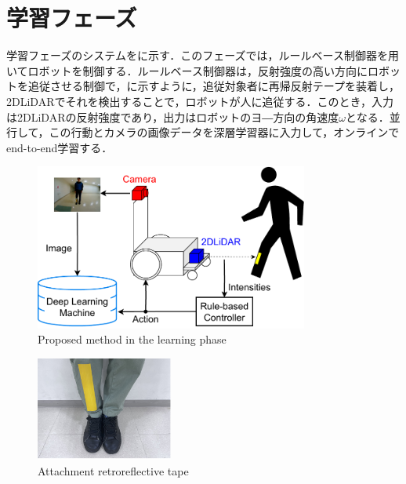 
\section{学習フェーズ}

  学習フェーズのシステムをに示す．このフェーズでは，ルールベース制御器を用いてロボットを制御する．ルールベース制御器は，反射強度の高い方向にロボットを追従させる制御で，に示すように，追従対象者に再帰反射テープを装着し，2DLiDARでそれを検出することで，ロボットが人に追従する．このとき，入力は2DLiDARの反射強度であり，出力はロボットのヨ―方向の角速度$\omega$となる．並行して，この行動とカメラの画像データを深層学習器に入力して，オンラインでend-to-end学習する．

  \begin{figure}[h]
    \centering
    \includegraphics[width=9cm] {images/pdf/RobotGuidance_learning_system}
    \captionsetup{justification=raggedright} %
    \caption{Proposed method in the learning phase}
    \label{Fig:RobotGuidance_learning_system}
  \end{figure}

  \begin{figure}[h]
    \centering
    \includegraphics[width=4.5cm] {images/pdf/RobotGuidance_learning_phase_leg}
    \captionsetup{justification=raggedright} %
    \caption{Attachment retroreflective tape}
    \label{Fig:RobotGuidance_learning_phase_leg}
  \end{figure}

\newpage
